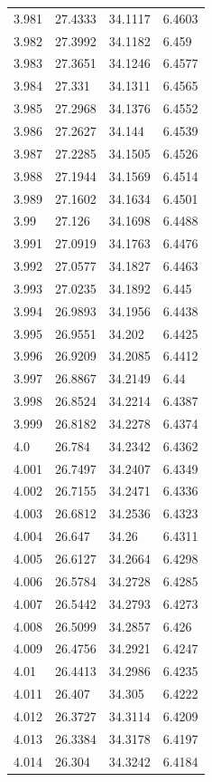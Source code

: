 \begin{tabular}{llll}
3.981 & 27.4333 & 34.1117 & 6.4603 \\
3.982 & 27.3992 & 34.1182 & 6.459 \\
3.983 & 27.3651 & 34.1246 & 6.4577 \\
3.984 & 27.331 & 34.1311 & 6.4565 \\
3.985 & 27.2968 & 34.1376 & 6.4552 \\
3.986 & 27.2627 & 34.144 & 6.4539 \\
3.987 & 27.2285 & 34.1505 & 6.4526 \\
3.988 & 27.1944 & 34.1569 & 6.4514 \\
3.989 & 27.1602 & 34.1634 & 6.4501 \\
3.99 & 27.126 & 34.1698 & 6.4488 \\
3.991 & 27.0919 & 34.1763 & 6.4476 \\
3.992 & 27.0577 & 34.1827 & 6.4463 \\
3.993 & 27.0235 & 34.1892 & 6.445 \\
3.994 & 26.9893 & 34.1956 & 6.4438 \\
3.995 & 26.9551 & 34.202 & 6.4425 \\
3.996 & 26.9209 & 34.2085 & 6.4412 \\
3.997 & 26.8867 & 34.2149 & 6.44 \\
3.998 & 26.8524 & 34.2214 & 6.4387 \\
3.999 & 26.8182 & 34.2278 & 6.4374 \\
4.0 & 26.784 & 34.2342 & 6.4362 \\
4.001 & 26.7497 & 34.2407 & 6.4349 \\
4.002 & 26.7155 & 34.2471 & 6.4336 \\
4.003 & 26.6812 & 34.2536 & 6.4323 \\
4.004 & 26.647 & 34.26 & 6.4311 \\
4.005 & 26.6127 & 34.2664 & 6.4298 \\
4.006 & 26.5784 & 34.2728 & 6.4285 \\
4.007 & 26.5442 & 34.2793 & 6.4273 \\
4.008 & 26.5099 & 34.2857 & 6.426 \\
4.009 & 26.4756 & 34.2921 & 6.4247 \\
4.01 & 26.4413 & 34.2986 & 6.4235 \\
4.011 & 26.407 & 34.305 & 6.4222 \\
4.012 & 26.3727 & 34.3114 & 6.4209 \\
4.013 & 26.3384 & 34.3178 & 6.4197 \\
4.014 & 26.304 & 34.3242 & 6.4184 \\

\end{tabular}
